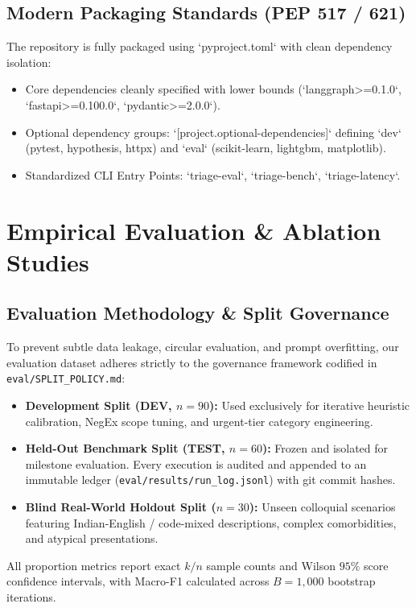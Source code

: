 \documentclass[11pt,a4paper]{article}
\begin{document}
\subsection{Modern Packaging Standards (PEP 517 / 621)}
The repository is fully packaged using `pyproject.toml` with clean dependency isolation:
\begin{itemize}[leftmargin=1.5em]
    \item Core dependencies cleanly specified with lower bounds (`langgraph>=0.1.0`, `fastapi>=0.100.0`, `pydantic>=2.0.0`).
    \item Optional dependency groups: `[project.optional-dependencies]` defining `dev` (pytest, hypothesis, httpx) and `eval` (scikit-learn, lightgbm, matplotlib).
    \item Standardized CLI Entry Points: `triage-eval`, `triage-bench`, `triage-latency`.
\end{itemize}

\section{Empirical Evaluation \& Ablation Studies}
\label{sec:ablation}

\subsection{Evaluation Methodology \& Split Governance}
To prevent subtle data leakage, circular evaluation, and prompt overfitting, our evaluation dataset adheres strictly to the governance framework codified in \texttt{eval/SPLIT\_POLICY.md}:
\begin{itemize}[leftmargin=1.5em]
    \item \textbf{Development Split (DEV, $n=90$):} Used exclusively for iterative heuristic calibration, NegEx scope tuning, and urgent-tier category engineering.
    \item \textbf{Held-Out Benchmark Split (TEST, $n=60$):} Frozen and isolated for milestone evaluation. Every execution is audited and appended to an immutable ledger (\texttt{eval/results/run\_log.jsonl}) with git commit hashes.
    \item \textbf{Blind Real-World Holdout Split ($n=30$):} Unseen colloquial scenarios featuring Indian-English / code-mixed descriptions, complex comorbidities, and atypical presentations.
\end{itemize}
All proportion metrics report exact $k/n$ sample counts and Wilson $95\%$ score confidence intervals, with Macro-F1 calculated across $B=1,000$ bootstrap iterations.
\end{document}
